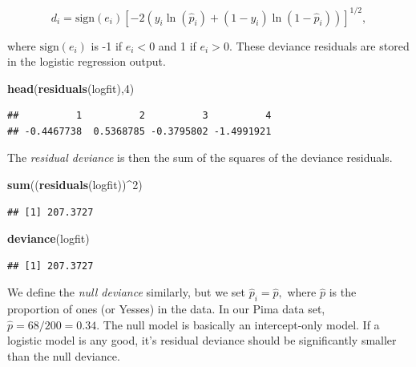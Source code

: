 \documentclass[
]{book}
\newenvironment{Shaded}{\begin{snugshade}}{\end{snugshade}}
\newcommand{\DecValTok}[1]{\textcolor[rgb]{0.00,0.00,0.81}{#1}}
\newcommand{\FunctionTok}[1]{\textcolor[rgb]{0.13,0.29,0.53}{\textbf{#1}}}
\newcommand{\NormalTok}[1]{#1}
\newcommand{\SpecialCharTok}[1]{\textcolor[rgb]{0.81,0.36,0.00}{\textbf{#1}}}
\theoremstyle{definition}
\theoremstyle{definition}
\theoremstyle{definition}
\theoremstyle{definition}
\theoremstyle{remark}
\begin{document}
\[d_i=\text{sign}(e_i)\left[-2(y_i\ln(\hat{p}_i)+(1-y_i)\ln(1-\hat{p}_i))\right]^{1/2},\]

where \(\text{sign}(e_i)\) is -1 if \(e_i<0\) and 1 if \(e_i>0.\) These deviance residuals are stored in the logistic regression output.

\begin{Shaded}
\begin{Highlighting}[]
\FunctionTok{head}\NormalTok{(}\FunctionTok{residuals}\NormalTok{(logfit),}\DecValTok{4}\NormalTok{)}
\end{Highlighting}
\end{Shaded}

\begin{verbatim}
##          1          2          3          4 
## -0.4467738  0.5368785 -0.3795802 -1.4991921
\end{verbatim}

The \emph{residual deviance} is then the sum of the squares of the deviance residuals.

\begin{Shaded}
\begin{Highlighting}[]
\FunctionTok{sum}\NormalTok{((}\FunctionTok{residuals}\NormalTok{(logfit))}\SpecialCharTok{\^{}}\DecValTok{2}\NormalTok{)}
\end{Highlighting}
\end{Shaded}

\begin{verbatim}
## [1] 207.3727
\end{verbatim}

\begin{Shaded}
\begin{Highlighting}[]
\FunctionTok{deviance}\NormalTok{(logfit)}
\end{Highlighting}
\end{Shaded}

\begin{verbatim}
## [1] 207.3727
\end{verbatim}

We define the \emph{null deviance} similarly, but we set \(\hat{p}_i=\hat{p},\) where \(\hat{p}\) is the proportion of ones (or Yesses) in the data. In our Pima data set, \(\hat{p}=68/200=0.34.\) The null model is basically an intercept-only model. If a logistic model is any good, it's residual deviance should be significantly smaller than the null deviance.

\begin{Shaded}
\end{Shaded}
\end{document}

